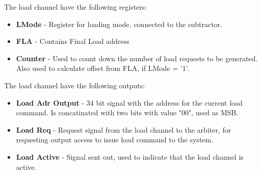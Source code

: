 The load channel have the following registers:

\begin{itemize}
    \item \textbf{LMode} - Register for loading mode, connected to the subtractor.
    \item \textbf{FLA} - Contains Final Load address
    \item \textbf{Counter} - Used to count down the number of load requests to be generated. Also used to calculate offset from FLA, if LMode = '1'.
\end{itemize}

The load channel have the following outputs:

\begin{itemize}
    \item \textbf{Load Adr Output} - 34 bit signal with the address for the current load command. Is concatinated with two bits with value "00", used as MSB.
    \item \textbf{Load Req} - Request signal from the load channel to the arbiter, for requesting output access to issue load command to the system.   
    \item \textbf{Load Active} - Signal sent out, used to indicate that the load channel is active.
\end{itemize}

